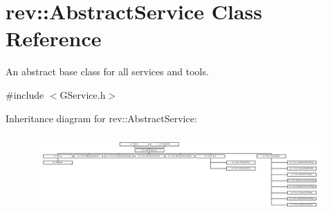 \hypertarget{classrev_1_1_abstract_service}{}\section{rev\+::Abstract\+Service Class Reference}
\label{classrev_1_1_abstract_service}


An abstract base class for all services and tools.  




{\ttfamily \#include $<$G\+Service.\+h$>$}

Inheritance diagram for rev\+::Abstract\+Service\+:\begin{figure}[H]
\begin{center}
\leavevmode
\includegraphics[height=3.028515cm]{classrev_1_1_abstract_service}
\end{center}
\end{figure}

